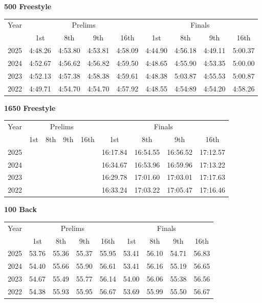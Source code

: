 \textbf{500 Freestyle}

\begin{flushleft}
\begin{tabular}{|c|c|c|c|c|c|c|c|c|}
\hline
Year & \multicolumn{4}{c|}{Prelims} & \multicolumn{4}{c|}{Finals} \\
\cline{2-9}
& 1st & 8th & 9th & 16th & 1st & 8th & 9th & 16th \\
\hline
2025 & 4:48.26 & 4:53.80 & 4:53.81 & 4:58.09 & 4:44.90 & 4:56.18 & 4:49.11 & 5:00.37 \\
2024 & 4:52.67 & 4:56.62 & 4:56.82 & 4:59.50 & 4:48.65 & 4:55.90 & 4:53.35 & 5:00.00 \\
2023 & 4:52.13 & 4:57.38 & 4:58.38 & 4:59.61 & 4:48.38 & 5:03.87 & 4:55.53 & 5:00.87 \\
2022 & 4:49.71 & 4:54.70 & 4:54.70 & 4:57.92 & 4:48.55 & 4:54:89 & 4:54.20 & 4:58.26 \\
\hline
\end{tabular}
\end{flushleft}

\textbf{1650 Freestyle}

\begin{flushleft}
\begin{tabular}{|c|c|c|c|c|c|c|c|c|}
\hline
Year & \multicolumn{4}{c|}{Prelims} & \multicolumn{4}{c|}{Finals} \\
\cline{2-9}
& 1st & 8th & 9th & 16th & 1st & 8th & 9th & 16th \\
\hline
2025 &  &  &  &  & 16:17.84 & 16:54.55 & 16:56.52 & 17:12.57 \\
2024 &  &  &  &  & 16:34.67 & 16:53.96 & 16:59.96 & 17:13.22 \\
2023 &  &  &  &  & 16:29.78 & 17:01.60 & 17:03.01 & 17:17.63 \\
2022 &  &  &  &  & 16:33.24 & 17:03.22 & 17:05.47 & 17:16.46 \\
\hline
\end{tabular}
\end{flushleft}

\textbf{100 Back}

\begin{flushleft}
\begin{tabular}{|c|c|c|c|c|c|c|c|c|}
\hline
Year & \multicolumn{4}{c|}{Prelims} & \multicolumn{4}{c|}{Finals} \\
\cline{2-9}
& 1st & 8th & 9th & 16th & 1st & 8th & 9th & 16th \\
\hline
2025 & 53.76 & 55.36 & 55.37 & 55.95 & 53.41 & 56.10 & 54.71 & 56.83 \\
2024 & 54.40 & 55.66 & 55.90 & 56.61 & 53.41 & 56.16 & 55.19 & 56.65 \\
2023 & 54.67 & 55.49 & 55.77 & 56.14 & 54.00 & 56.06 & 55:38 & 56.56 \\
2022 & 54.38 & 55.93 & 55.95 & 56.67 & 53.69 & 55.99 & 55.50 & 56.67 \\
\hline
\end{tabular}
\end{flushleft}

